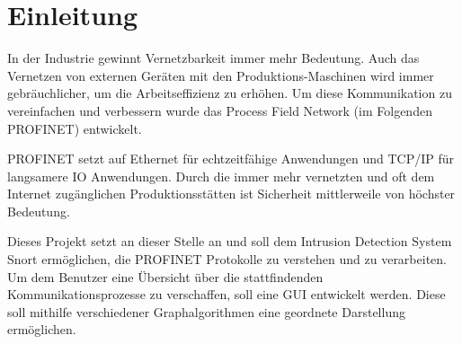 \chapter*{Einleitung}

In der Industrie gewinnt Vernetzbarkeit immer mehr Bedeutung. Auch das Vernetzen von externen Geräten mit den Produktions-Maschinen wird immer gebräuchlicher, um die Arbeitseffizienz zu erhöhen. Um diese Kommunikation zu vereinfachen und verbessern wurde das Process Field Network (im Folgenden PROFINET) entwickelt.\par
PROFINET setzt auf Ethernet für echtzeitfähige Anwendungen und TCP/IP für langsamere IO Anwendungen. Durch die immer mehr vernetzten und oft dem Internet zugänglichen Produktionsstätten ist Sicherheit mittlerweile von höchster Bedeutung. \par
Dieses Projekt setzt an dieser Stelle an und soll dem Intrusion Detection System Snort ermöglichen, die PROFINET Protokolle zu verstehen und zu verarbeiten. Um dem Benutzer eine Übersicht über die stattfindenden Kommunikationsprozesse zu verschaffen, soll eine GUI entwickelt werden. Diese soll mithilfe verschiedener Graphalgorithmen eine geordnete Darstellung ermöglichen. 
